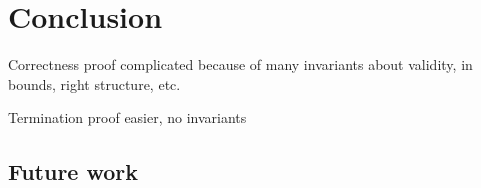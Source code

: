 
\chapter{Conclusion}\label{chapter:conclusion}


Correctness proof complicated because of many invariants about validity, in bounds, right structure, etc.

Termination proof easier, no invariants

\section{Future work}